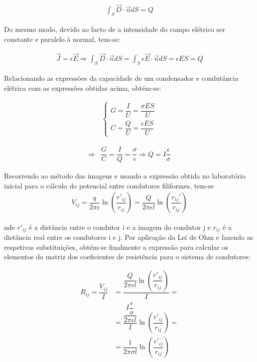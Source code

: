 \documentclass[portuguese, a4paper]{article}
\begin{document}
	\begin{align*}
			\int _ { S } \vec{D} \cdot \vec{n} d S = Q
	\end{align*}

	\par
	Do mesmo modo, devido ao facto de a intensidade do campo elétrico ser constante e paralelo à normal, tem-se:

	\begin{align*}
		\vec{J} = \epsilon \vec{E} \Rightarrow \int _ { S } \vec{D} \cdot \vec{n} d S = \int _ { S } \epsilon \vec{E} \cdot \vec{n} d S = \epsilon E S = Q
	\end{align*}

	\par
	Relacionando as expressões da capacidade de um condensador e condutância elétrica com as expressões obtidas acima, obtém-se:

	\begin{align*}
		\begin{cases}
			G = \dfrac{I}{U} = \dfrac{\sigma E S}{U} \\[1em]
    	C = \dfrac{Q}{U} = \dfrac{\epsilon E S}{U}
 		\end{cases}
	\end{align*}

	\begin{align*}
		\Rightarrow &\dfrac{G}{C} = \dfrac{I}{Q} = \dfrac{\sigma}{\epsilon} \Rightarrow Q = I\dfrac{\epsilon}{\sigma}
	\end{align*}

	\par
	Recorrendo ao método das imagens e usando a expressão obtida no laboratório inicial para o cálculo do potencial entre condutores filiformes, tem-se
	\begin{align*}
		V_{ij} = \dfrac{q}{2\pi\epsilon} \ln\left(\dfrac{r'_{ij} }{r_{ij} }\right) = \dfrac{Q}{2\pi\epsilon l} \ln\left(\dfrac{r_{ij} '}{r_{ij} }\right)
	\end{align*}

	\par
	nde $r'_{ij}$ é a distância entre o condutor i e a imagem do condutor j e $r_{ij}$ é a distância real entre os condutores i e j. Por aplicação da Lei de Ohm e fazendo as respetivas substituições, obtém-se finalmente a expressão para calcular os elementos da matriz dos coeficientes de resistência para o sistema de condutores:

	\begin{align*}
		R_{ij} = \dfrac{V_{ij} }{I} &= \dfrac{\dfrac{Q}{2\pi\epsilon l} \ln\left(\dfrac{r'_{ij} }{r_{ij} }\right)}{I} = \\
		&= \dfrac{\dfrac{I\dfrac{\epsilon}{\sigma}}{2\pi\epsilon l}}{I} \ln\left(\dfrac{r'_{ij} }{r_{ij} }\right) = \\
		&= \dfrac{1}{2\pi\sigma l}\ln\left(\dfrac{r'_{ij} }{r_{ij} }\right)
	\end{align*}
\end{document}
